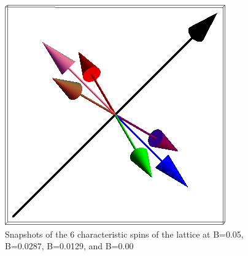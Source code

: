 \documentclass{article}
\begin{document}
\begin{figure}[ht]
\includegraphics[scale=0.27]{111_3000/501S005to000G.png}
\caption{Snapshots of the 6 characteristic spins of the lattice at B=0.05, B=0.0287, B=0.0129, and B=0.00}
\end{figure}
\pagebreak
\end{document}
